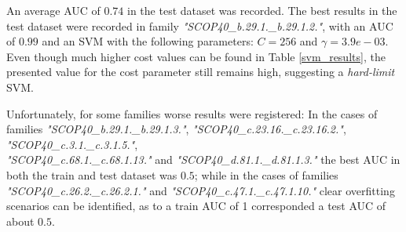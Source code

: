 \documentclass[11pt]{article}
\begin{document}
An average AUC of $0.74$ in the test dataset was recorded. The best results in the test dataset were recorded in family \emph{"SCOP40\_b.29.1.\_b.29.1.2."}, with an AUC of $0.99$ and an SVM with the following parameters: $C = 256$ and $\gamma = 3.9e-03$. Even though much higher cost values can be found in Table \ref{svm_results}, the presented value for the cost parameter still remains high, suggesting a \emph{hard-limit} SVM.

Unfortunately, for some families worse results were registered: In the cases of families \emph{"SCOP40\_b.29.1.\_b.29.1.3."}, \emph{"SCOP40\_c.23.16.\_c.23.16.2."}, \emph{"SCOP40\_c.3.1.\_c.3.1.5."},\\\emph{"SCOP40\_c.68.1.\_c.68.1.13."} and \emph{"SCOP40\_d.81.1.\_d.81.1.3."} the best AUC in both the train and test dataset was $0.5$; while in the cases of families \emph{"SCOP40\_c.26.2.\_c.26.2.1."} and \emph{"SCOP40\_c.47.1.\_c.47.1.10."} clear overfitting scenarios can be identified, as to a train AUC of 1 corresponded a test AUC of about $0.5$.
\end{document}
